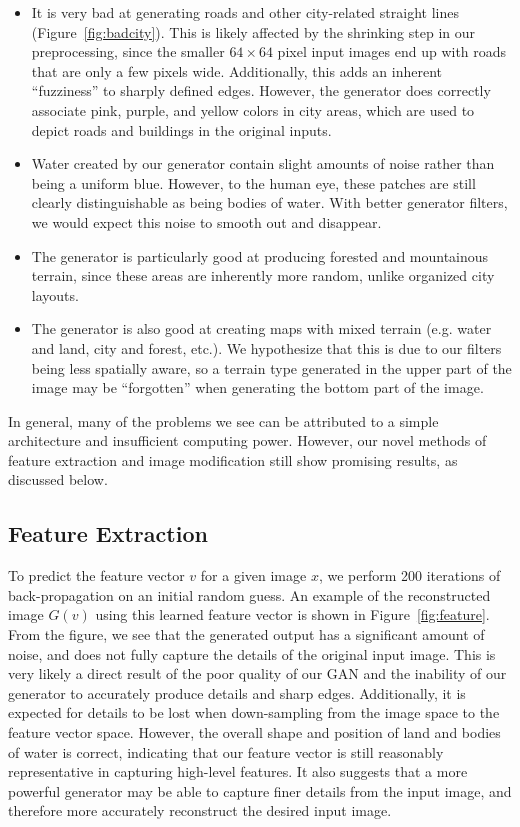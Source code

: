 \documentclass[11pt,twocolumn,letterpaper]{article}
\begin{document}
\begin{itemize}
\item It is very bad at generating roads and other city-related straight lines 
(Figure~\ref{fig:badcity}). 
This is likely affected by the shrinking step in our preprocessing, since the smaller $64 \times 64$ pixel input images end up with roads that are only a few pixels wide. Additionally, this adds an inherent ``fuzziness'' to sharply defined edges. However, the generator does correctly associate pink, purple, and yellow colors in city areas, which are used to depict roads and buildings in the original inputs. 

\item Water created by our generator contain slight amounts of noise rather than being a uniform blue. However, to the human eye, these patches are still clearly distinguishable as being bodies of water. With better generator filters, we would expect this noise to smooth out and disappear.
\item The generator is particularly good at producing forested and mountainous terrain, since these areas are inherently more random, unlike organized city layouts.
\item The generator is also good at creating maps with mixed terrain (e.g. water and land, city and forest, etc.). We hypothesize that this is due to our filters being less spatially aware, so a terrain type generated in the upper part of the image may be ``forgotten'' when generating the bottom part of the image.
\end{itemize}

In general, many of the problems we see can be attributed to a simple architecture and insufficient computing power. However, our novel methods of feature extraction and image modification still show promising results, as discussed below.

\subsection{Feature Extraction}
To predict the feature vector $v$ for a given image $x$, we perform 200 iterations of back-propagation on an initial random guess. An example of the reconstructed image $G(v)$ using this learned feature vector is shown in Figure~\ref{fig:feature}. From the figure, we see that the generated output has a significant amount of noise, and does not fully capture the details of the original input image. This is very likely a direct result of the poor quality of our GAN and the inability of our generator to accurately produce details and sharp edges. Additionally, it is expected for details to be lost when down-sampling from the image space to the feature vector space. However, the overall shape and position of land and bodies of water is correct, indicating that our feature vector is still reasonably representative in capturing high-level features. It also suggests that a more powerful generator may be able to capture finer details from the input image, and therefore more accurately reconstruct the desired input image.
\end{document}
